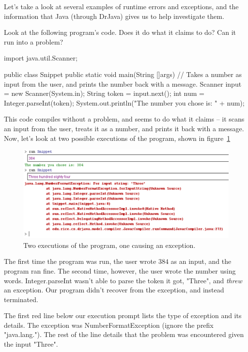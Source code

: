 Let's take a look at several examples of runtime errors and exceptions, and the information that Java (through DrJava) gives us to help investigate them.

\begin{example}
Look at the following program's code. Does it do what it claims to do? Can it run into a problem?

\begin{code}
import java.util.Scanner;

public class Snippet{
    public static void main(String []args){
      // Takes a number as input from the user, and prints the number back with a message.
      Scanner input = new Scanner(System.in);
      String token = input.next();
      int num = Integer.parseInt(token);
      System.out.println("The number you chose is: " + num);
    }
}
\end{code}
\end{example}

This code compiles without a problem, and seems to do what it claims -- it scans an input from the user, treats it as a number, and prints it back with a message. Now, let's look at two possible executions of the program, shown in figure~\ref{fig:number_format_error}

\begin{figure}[h!]
\centering
\includegraphics[scale=0.7]{images/number_format_exception.PNG}
\caption{Two executions of the program, one causing an exception.}
\label{fig:number_format_error}
\end{figure}

The first time the program was run, the user wrote $384$ as an input, and the program ran fine. The second time, however, the user wrote the number using words. Integer.parseInt wasn't able to parse the token it got, "Three", and \emph{threw} an exception. Our program didn't recover from the exception, and instead terminated.

The first red line below our execution prompt lists the type of exception and its details. The exception was NumberFormatException (ignore the prefix "java.lang."). The rest of the line details that the problem was encountered given the input "Three".

